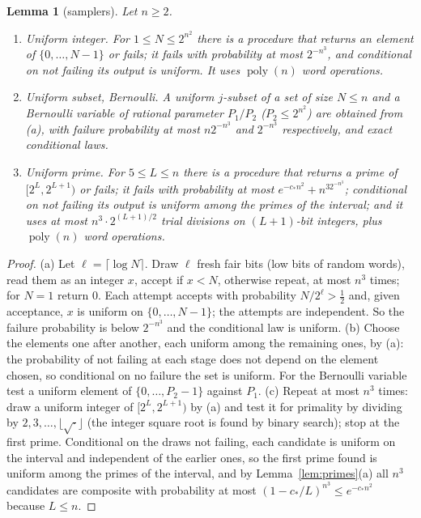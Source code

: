 \documentclass[11pt]{article}
\newtheorem{lemma}{Lemma}[section]
\theoremstyle{definition}
\newcommand{\floor}[1]{\lfloor #1\rfloor}
\newcommand{\ceil}[1]{\lceil #1\rceil}
\newcommand{\poly}{\operatorname{poly}}
\begin{document}
\begin{lemma}[samplers]\label{lem:samplers}
Let $n\ge2$.
\begin{enumerate}[label=\textup{(\alph*)}]
\item \emph{Uniform integer.} For $1\le N\le2^{n^2}$ there is a procedure that returns an element of
$\{0,\dots,N-1\}$ or fails; it fails with probability at most $2^{-n^3}$, and conditional on not failing its output
is uniform. It uses $\poly(n)$ word operations.
\item \emph{Uniform subset, Bernoulli.} A uniform $j$-subset of a set of size $N\le n$ and a Bernoulli variable of
rational parameter $P_1/P_2$ ($P_2\le 2^{n^2}$) are obtained from (a), with failure probability at most $n2^{-n^3}$
and $2^{-n^3}$ respectively, and exact conditional laws.
\item \emph{Uniform prime.} For $5\le L\le n$ there is a procedure that returns a prime of $[2^L,2^{L+1})$ or fails; it
fails with probability at most $e^{-c_\ast n^2}+n^32^{-n^3}$; conditional on not failing its output is uniform among
the primes of the interval; and it uses at most $n^3\cdot2^{(L+1)/2}$ trial divisions on $(L+1)$-bit integers, plus
$\poly(n)$ word operations.
\end{enumerate}
\end{lemma}
\begin{proof}
(a) Let $\ell=\ceil{\log N}$. Draw $\ell$ fresh fair bits (low bits of random words), read them as an integer $x$,
accept if $x<N$, otherwise repeat, at most $n^3$ times; for $N=1$ return $0$. Each attempt accepts with probability
$N/2^\ell>\tfrac12$ and, given acceptance, $x$ is uniform on $\{0,\dots,N-1\}$; the attempts are independent. So the
failure probability is below $2^{-n^3}$ and the conditional law is uniform. (b) Choose the elements one after
another, each uniform among the remaining ones, by (a): the probability of not failing at each stage does not depend
on the element chosen, so conditional on no failure the set is uniform. For the Bernoulli variable test a uniform
element of $\{0,\dots,P_2-1\}$ against $P_1$. (c) Repeat at most $n^3$ times: draw a uniform integer of
$[2^L,2^{L+1})$ by (a) and test it for primality by dividing by $2,3,\dots,\floor{\sqrt{\cdot}}$ (the integer square
root is found by binary search); stop at the first prime. Conditional on the draws not failing, each candidate is
uniform on the interval and independent of the earlier ones, so the first prime found is uniform among the primes of
the interval, and by Lemma~\ref{lem:primes}(a) all $n^3$ candidates are composite with probability at most
$(1-c_\ast/L)^{n^3}\le e^{-c_\ast n^2}$ because $L\le n$.
\end{proof}
\end{document}

